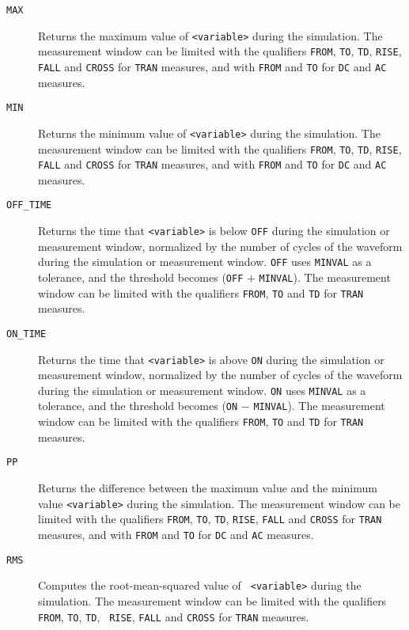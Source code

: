 \begin{Command}
\begin{Arguments}
\begin{description}
  \item[\tt MAX] Returns the maximum value of {\tt <variable>} during
    the simulation.  The measurement window can be limited with the
    qualifiers {\tt FROM}, {\tt TO}, {\tt TD}, {\tt RISE}, {\tt FALL}
    and {\tt CROSS} for {\tt TRAN} measures, and with {\tt FROM} and
    {\tt TO} for {\tt DC} and {\tt AC} measures.

  \item[\tt MIN] Returns the minimum value of {\tt <variable>} during
    the simulation.  The measurement window can be limited with the
    qualifiers {\tt FROM}, {\tt TO}, {\tt TD}, {\tt RISE}, {\tt FALL}
    and {\tt CROSS} for {\tt TRAN} measures, and with {\tt FROM} and
    {\tt TO} for {\tt DC} and {\tt AC} measures.

  \item[\tt OFF\_TIME] Returns the time that {\tt <variable>} is below
    {\tt OFF} during the simulation or measurement window, normalized
    by the number of cycles of the waveform during the simulation or
    measurement window.  {\tt OFF} uses {\tt MINVAL} as a tolerance,
    and the threshold becomes ({\tt OFF} $+$ {\tt MINVAL}).  The
    measurement window can be limited with the qualifiers {\tt FROM},
    {\tt TO} and {\tt TD} for {\tt TRAN} measures.

  \item[\tt ON\_TIME] Returns the time that {\tt <variable>} is above
    {\tt ON} during the simulation or measurement window, normalized
    by the number of cycles of the waveform during the simulation or
    measurement window.  {\tt ON} uses {\tt MINVAL} as a tolerance,
    and the threshold becomes ({\tt ON} $-$ {\tt MINVAL}).  The
    measurement window can be limited with the qualifiers {\tt FROM},
    {\tt TO} and {\tt TD} for {\tt TRAN} measures.

  \item[\tt PP] Returns the difference between the maximum value and
    the minimum value {\tt <variable>} during the simulation. The
    measurement window can be limited with the qualifiers {\tt FROM},
    {\tt TO}, {\tt TD}, {\tt RISE}, {\tt FALL} and {\tt CROSS} for
    {\tt TRAN} measures, and with {\tt FROM} and {\tt TO} for {\tt DC}
    and {\tt AC} measures.

  \item[\tt RMS] Computes the root-mean-squared value of {\tt
    <variable>} during the simulation.  The measurement window can be
    limited with the qualifiers {\tt FROM}, {\tt TO}, {\tt TD}, {\tt
    RISE}, {\tt FALL} and {\tt CROSS} for {\tt TRAN} measures.


\end{description}
\end{Arguments}
\end{Command}
